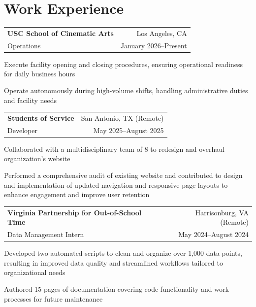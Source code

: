 \documentclass[letterpaper,10pt]{article}
\makeatletter
\newcommand{\entry}[4]{%
  \noindent\begin{tabularx}{\textwidth}{@{}X r@{}}
    \textbf{#1} & #2 \\
    #3 & #4 \\
  \end{tabularx}%
  \vspace{-2pt}
}
\makeatother
\begin{document}
\section{Work Experience}
\entry{USC School of Cinematic Arts}{Los Angeles, CA}
      {Operations}{January 2026--Present}
\begin{tight}
  \item Execute facility opening and closing procedures, ensuring operational readiness for daily business hours
  \item Operate autonomously during high-volume shifts, handling administrative duties and facility needs
\end{tight}
\vspace{2pt}
\entry{Students of Service}{San Antonio, TX (Remote)}
      {Developer}{May 2025--August 2025}
\begin{tight}
  \item Collaborated with a multidisciplinary team of 8 to redesign and overhaul organization's website
  \item Performed a comprehensive audit of existing website and contributed to design and implementation of updated navigation and responsive page layouts to enhance engagement and improve user retention
\end{tight}
\vspace{2pt}
\entry{Virginia Partnership for Out-of-School Time}{Harrisonburg, VA (Remote)}
      {Data Management Intern}{May 2024--August 2024}
\begin{tight}
  \item Developed two automated scripts to clean and organize over 1,000 data points, resulting in improved data quality and streamlined workflows tailored to organizational needs
  \item Authored 15 pages of documentation covering code functionality and work processes for future maintenance
\end{tight}

\end{document}
